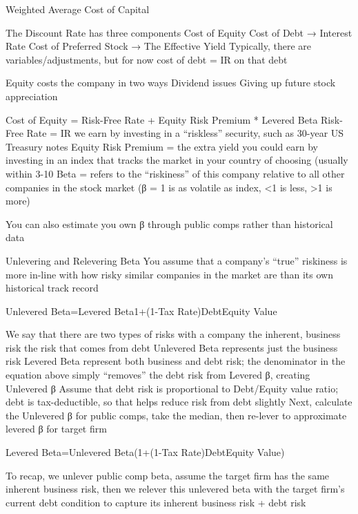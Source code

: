 \documentclass[10pt]{article}
\begin{document}
    \begin{core}{Weighted Average Cost of Capital}

      The Discount Rate has three components
      Cost of Equity
      Cost of Debt → Interest Rate
      Cost of Preferred Stock → The Effective Yield
      Typically, there are variables/adjustments, but for now cost of debt = IR on that debt

      Equity costs the company in two ways
      Dividend issues
      Giving up future stock appreciation

      Cost of Equity = Risk-Free Rate + Equity Risk Premium * Levered Beta
      Risk-Free Rate = IR we earn by investing in a “riskless” security, such as 30-year US Treasury notes
      Equity Risk Premium = the extra yield you could earn by investing in an index that tracks the market in your country of choosing (usually within 3-10%
      Beta = refers to the “riskiness” of this company relative to all other companies in the stock market (β = 1 is as volatile as index, <1 is less, >1 is more)

      You can also estimate you own β through public comps rather than historical data

      Unlevering and Relevering Beta
      You assume that a company’s “true” riskiness is more in-line with how risky similar companies in the market are than its own historical track record

      Unlevered Beta=Levered Beta1+(1-Tax Rate)DebtEquity Value

      We say that there are two types of risks with a company
      the inherent, business risk
      the risk that comes from debt
      Unlevered Beta represents just the business risk
      Levered Beta represent both business and debt risk; the denominator in the equation above simply “removes” the debt risk from Levered β, creating Unlevered β
      Assume that debt risk is proportional to Debt/Equity value ratio; debt is tax-deductible, so that helps reduce risk from debt slightly
      Next, calculate the Unlevered β for public comps, take the median, then re-lever to approximate levered β for target firm

      Levered Beta=Unlevered Beta(1+(1-Tax Rate)DebtEquity Value)

      To recap, we unlever public comp beta, assume the target firm has the same inherent business risk, then we relever this unlevered beta with the target firm’s current debt condition to capture its inherent business risk + debt risk


\end{core}
\end{document}
